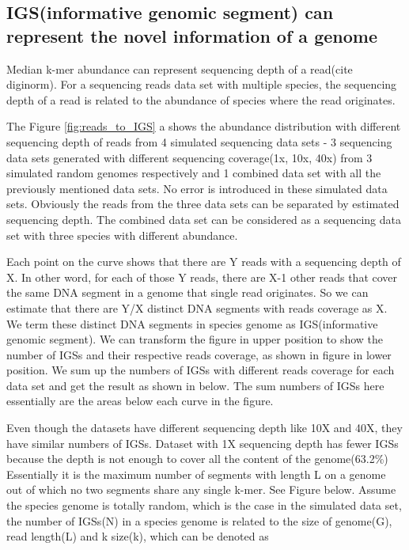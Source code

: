 \documentclass{article}
\begin{document}
\subsection{IGS(informative genomic segment) can represent the novel information of a genome}

Median k-mer abundance can represent sequencing depth of a read(cite diginorm). For a sequencing reads data set with multiple species, the sequencing depth of a read is related to the abundance of species where the read originates. 


The Figure \ref{fig:reads_to_IGS} a shows the abundance distribution with different sequencing depth of reads from 4 simulated sequencing data sets - 3 sequencing data sets generated with different sequencing coverage(1x, 10x, 40x) from 3 simulated random genomes respectively and 1 combined data set with all the previously mentioned data sets. No error is introduced in these simulated data sets. Obviously the reads from the three data sets can be separated by estimated sequencing depth. The combined data set can be considered as a sequencing data set with three species with different abundance.

Each point on the curve shows that there are Y reads with a sequencing depth of X. In other word, for each of those Y reads, there are X-1 other reads that cover the same DNA segment in a genome that single read originates. So we can estimate that there are Y/X distinct DNA segments with reads coverage as X. We term these distinct DNA segments in species genome as IGS(informative genomic segment). We can transform the figure in upper position to show the number of IGSs and their respective reads coverage, as shown in figure in lower position. We sum up the numbers of IGSs with different reads coverage for each data set and get the result as shown in below. The sum numbers of IGSs here essentially are the areas below each curve in the figure.

Even though the datasets have different sequencing depth like 10X and 40X, they have similar numbers of IGSs. Dataset with 1X sequencing depth has fewer IGSs because the depth is not enough to cover all the content of the genome(63.2\%) Essentially it is the maximum number of segments with length L on a genome out of which no two segments share any single k-mer. See Figure below. Assume the species genome is totally random, which is the case in the simulated data set, the number of IGSs(N) in a species genome is related to the size of genome(G), read length(L) and k size(k), which can be denoted as
\end{document}
